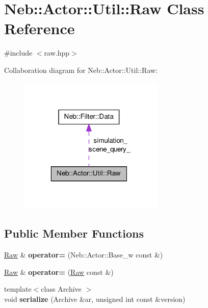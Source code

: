 \hypertarget{classNeb_1_1Actor_1_1Util_1_1Raw}{\section{\-Neb\-:\-:\-Actor\-:\-:\-Util\-:\-:\-Raw \-Class \-Reference}
\label{classNeb_1_1Actor_1_1Util_1_1Raw}
}


{\ttfamily \#include $<$raw.\-hpp$>$}



\-Collaboration diagram for \-Neb\-:\-:\-Actor\-:\-:\-Util\-:\-:\-Raw\-:\nopagebreak
\begin{figure}[H]
\begin{center}
\leavevmode
\includegraphics[width=196pt]{classNeb_1_1Actor_1_1Util_1_1Raw__coll__graph}
\end{center}
\end{figure}
\subsection*{\-Public \-Member \-Functions}
\begin{DoxyCompactItemize}
\item 
\hypertarget{classNeb_1_1Actor_1_1Util_1_1Raw_a40bc87aaaccadc6ffc449eeff796e2a6}{\hyperlink{classNeb_1_1Actor_1_1Util_1_1Raw}{\-Raw} \& {\bfseries operator=} (\-Neb\-::\-Actor\-::\-Base\-\_\-w const \&)}\label{classNeb_1_1Actor_1_1Util_1_1Raw_a40bc87aaaccadc6ffc449eeff796e2a6}

\item 
\hypertarget{classNeb_1_1Actor_1_1Util_1_1Raw_a8c4b27f90d4128a7fc6758f2b4605d22}{\hyperlink{classNeb_1_1Actor_1_1Util_1_1Raw}{\-Raw} \& {\bfseries operator=} (\hyperlink{classNeb_1_1Actor_1_1Util_1_1Raw}{\-Raw} const \&)}\label{classNeb_1_1Actor_1_1Util_1_1Raw_a8c4b27f90d4128a7fc6758f2b4605d22}

\item 
\hypertarget{classNeb_1_1Actor_1_1Util_1_1Raw_aa18bcb6b2c4a468e3cc393ad20fff990}{{\footnotesize template$<$class Archive $>$ }\\void {\bfseries serialize} (\-Archive \&ar, unsigned int const \&version)}\label{classNeb_1_1Actor_1_1Util_1_1Raw_aa18bcb6b2c4a468e3cc393ad20fff990}

\end{DoxyCompactItemize}
